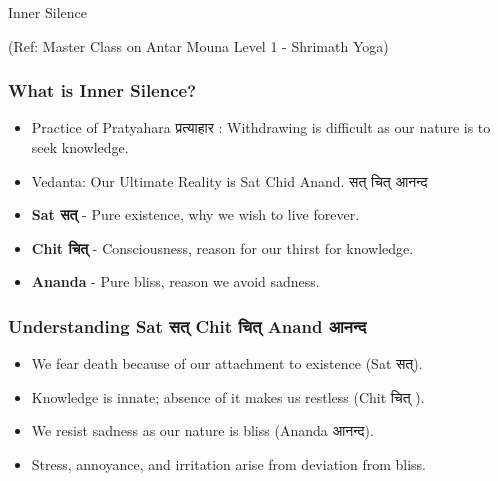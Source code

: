 		
		
  




\begin{frame}[fragile]\frametitle{}
\begin{center}
{\Large Inner Silence}
\end{center}

{\tiny (Ref:  Master Class on Antar Mouna Level 1 - Shrimath Yoga)}

\end{frame}

\begin{frame}[fragile]\frametitle{What is Inner Silence?}
    \begin{itemize}
        \item Practice of Pratyahara प्रत्याहार : Withdrawing is difficult as our nature is to seek knowledge.
        \item Vedanta: Our Ultimate Reality is Sat Chid Anand. सत् चित् आनन्द 
        \item \textbf{Sat सत्} - Pure existence, why we wish to live forever.
        \item \textbf{Chit चित् } - Consciousness, reason for our thirst for knowledge.
        \item \textbf{Ananda} - Pure bliss, reason we avoid sadness.
    \end{itemize}
\end{frame}

\begin{frame}[fragile]\frametitle{Understanding Sat सत्  Chit चित्  Anand आनन्द}
    \begin{itemize}
        \item We fear death because of our attachment to existence (Sat सत्).
        \item Knowledge is innate; absence of it makes us restless (Chit चित् ).
        \item We resist sadness as our nature is bliss (Ananda आनन्द).
        \item Stress, annoyance, and irritation arise from deviation from bliss.
    \end{itemize}
\end{frame}

